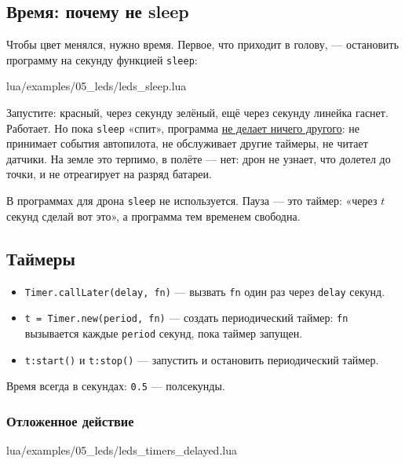 \subsection{Время: почему не sleep}

Чтобы цвет менялся, нужно время. Первое, что приходит в голову, --- остановить программу на секунду функцией \verb|sleep|:

\begin{codefile}{lua/examples/05_leds/leds_sleep.lua}
\end{codefile}

Запустите: красный, через секунду зелёный, ещё через секунду линейка гаснет. Работает. Но пока \verb|sleep| «спит», программа \hyperlink{term:blocking}{не делает ничего другого}: не принимает события автопилота, не обслуживает другие таймеры, не читает датчики. На земле это терпимо, в полёте --- нет: дрон не узнает, что долетел до точки, и не отреагирует на разряд батареи.

\begin{rulebox}
В программах для дрона \verb|sleep| не используется. Пауза --- это таймер: «через $t$ секунд сделай вот это», а программа тем временем свободна.
\end{rulebox}

\subsection{Таймеры}

\begin{codebox}
\begin{itemize}
  \item \verb|Timer.callLater(delay, fn)| --- вызвать \verb|fn| один раз через \verb|delay| секунд.
  \item \verb|t = Timer.new(period, fn)| --- создать периодический таймер: \verb|fn| вызывается каждые \verb|period| секунд, пока таймер запущен.
  \item \verb|t:start()| и \verb|t:stop()| --- запустить и остановить периодический таймер.
\end{itemize}
Время всегда в секундах: \verb|0.5| --- полсекунды.
\end{codebox}

\subsubsection*{Отложенное действие}

\begin{codefile}{lua/examples/05_leds/leds_timers_delayed.lua}
\end{codefile}

